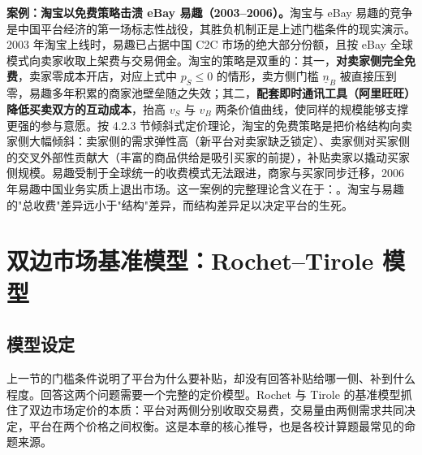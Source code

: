 \textbf{案例：淘宝以免费策略击溃 eBay 易趣（2003–2006）。}淘宝与 eBay 易趣的竞争是中国平台经济的第一场标志性战役，其胜负机制正是上述门槛条件的现实演示。2003 年淘宝上线时，易趣已占据中国 C2C 市场的绝大部分份额，且按 eBay 全球模式向卖家收取上架费与交易佣金。淘宝的策略是双重的：其一，\textbf{对卖家侧完全免费}，卖家零成本开店，对应上式中 $p_S \leq 0$ 的情形，卖方侧门槛 $\underline{n}_B$ 被直接压到零，易趣多年积累的商家池壁垒随之失效；其二，\textbf{配套即时通讯工具（阿里旺旺）降低买卖双方的互动成本}，抬高 $v_S$ 与 $v_B$ 两条价值曲线，使同样的规模能够支撑更强的参与意愿。按 4.2.3 节倾斜式定价理论，淘宝的免费策略是把价格结构向卖家侧大幅倾斜：卖家侧的需求弹性高（新平台对卖家缺乏锁定）、卖家侧对买家侧的交叉外部性贡献大（丰富的商品供给是吸引买家的前提），补贴卖家以撬动买家侧规模。易趣受制于全球统一的收费模式无法跟进，商家与买家同步迁移，2006 年易趣中国业务实质上退出市场。这一案例的完整理论含义在于：。淘宝与易趣的"总收费"差异远小于"结构"差异，而结构差异足以决定平台的生死。

\section{双边市场基准模型：Rochet–Tirole 模型}

\subsection{模型设定}

上一节的门槛条件说明了平台为什么要补贴，却没有回答补贴给哪一侧、补到什么程度。回答这两个问题需要一个完整的定价模型。Rochet 与 Tirole 的基准模型抓住了双边市场定价的本质：平台对两侧分别收取交易费，交易量由两侧需求共同决定，平台在两个价格之间权衡。这是本章的核心推导，也是各校计算题最常见的命题来源。

